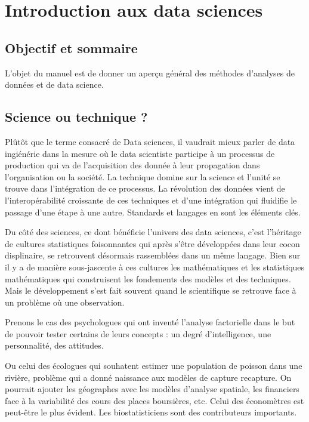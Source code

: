 \documentclass[
]{book}
\begin{document}
\hypertarget{intro}{%
\chapter{Introduction aux data sciences}\label{intro}}

\hypertarget{objectif-et-sommaire}{%
\section{Objectif et sommaire}\label{objectif-et-sommaire}}

L'objet du manuel est de donner un aperçu général des méthodes d'analyses de données et de data science.

\hypertarget{science-ou-technique}{%
\section{Science ou technique ?}\label{science-ou-technique}}

Plûtôt que le terme consacré de Data sciences, il vaudrait mieux parler de data ingiénérie dans la mesure où le data scientiste participe à un processus de production qui va de l'acquisition des donnée à leur propagation dans l'organisation ou la société. La technique domine sur la science et l'unité se trouve dans l'intégration de ce processus. La révolution des données vient de l'interopérabilité croissante de ces techniques et d'une intégration qui fluidifie le passage d'une étape à une autre. Standards et langages en sont les éléments clés.

Du côté des sciences, ce dont bénéficie l'univers des data sciences, c'est l'héritage de cultures statistiques foisonnantes qui après s'être développées dans leur cocon displinaire, se retrouvent désormais rassemblées dans un même langage. Bien sur il y a de manière sous-jascente à ces cultures les mathématiques et les statistiques mathématiques qui construisent les fondements des modèles et des techniques. Mais le développement s'est fait souvent quand le scientifique se retrouve face à un problème où une observation.

Prenons le cas des psychologues qui ont inventé l'analyse factorielle dans le but de pouvoir tester certains de leurs concepts : un degré d'intelligence, une personnalité, des attitudes.

Ou celui des écologues qui souhatent estimer une population de poisson dans une rivière, problème qui a donné naissance aux modèles de capture recapture. On pourrait ajouter les géographes avec les modèles d'analyse spatiale, les financiers face à la variabilité des cours des places boursières, etc. Celui des économètres est peut-être le plus évident. Les biostatisticiens sont des contributeurs importants.
\end{document}
